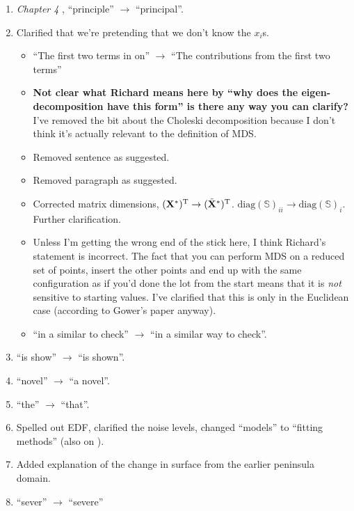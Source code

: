 \begin{enumerate}
\begin{itemize}
\end{itemize}
\item \textit{Chapter 4} ,  ``principle'' $\rightarrow$ ``principal''.
\item {} Clarified that we're pretending that we don't know the $x_i$s.
\begin{itemize}
	\item {}``The first two terms in on'' $\rightarrow$ ``The contributions from the first two terms'' 
	\item {} \textbf{Not clear what Richard means here by ``why does the eigen-decomposition have this form'' is there any way you can clarify?} I've removed the bit about the Choleski decomposition because I don't think it's actually relevant to the definition of MDS.
	\item {} Removed sentence as suggested.
	\item {} Removed paragraph as suggested.
	\item {} Corrected matrix dimensions, $(\mathbf{X}^*)^{\text{T}} \rightarrow (\tilde{\mathbf{X}}^*)^{\text{T}}$.  $\text{diag}(\mathbb{S})_{ii} \rightarrow \text{diag}(\mathbb{S})_i$. Further clarification.
	\item {} Unless I'm getting the wrong end of the stick here, I think Richard's statement is incorrect. The fact that you can perform MDS on a reduced set of points, insert the other points and end up with the same configuration as if you'd done the lot from the start means that it is \textit{not} sensitive to starting values. I've clarified that this is only in the Euclidean case (according to Gower's paper anyway).
	\item {} ``in a similar to check'' $\rightarrow$ ``in a similar way to check''.
\end{itemize}
\item {} ``is show'' $\rightarrow$ ``is shown''.
\item {} ``novel'' $\rightarrow$ ``a novel''.
\item {}  ``the'' $\rightarrow$ ``that''.
\item {} Spelled out EDF, clarified the noise levels, changed ``models'' to ``fitting methods'' (also on ).
\item {} Added explanation of the change in surface from the earlier peninsula domain.
\item {} ``sever'' $\rightarrow$ ``severe''

\end{enumerate}

